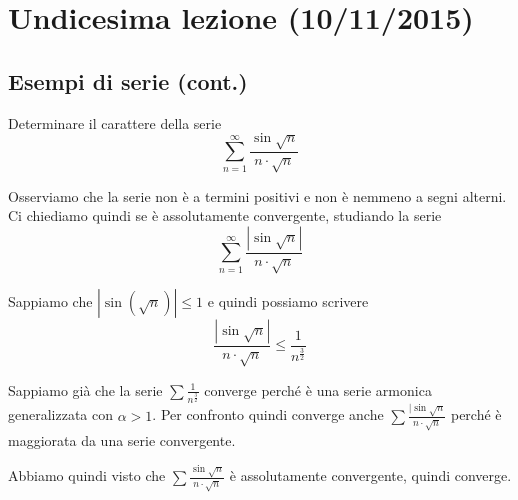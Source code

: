 \chapter{Undicesima lezione (10/11/2015)}

\section{Esempi di serie (cont.)}

\begin{example}
Determinare il carattere della serie
\begin{equation*}
\sum_{n=1}^\infty \frac{\sin \sqrt{n}}{n \cdot \sqrt{n}}
\end{equation*}

Osserviamo che la serie non è a termini positivi e non è nemmeno a segni alterni. Ci chiediamo quindi se è assolutamente convergente, studiando la serie
\begin{equation*}
\sum_{n=1}^\infty \frac{|\sin \sqrt{n}|}{n \cdot \sqrt{n}}
\end{equation*}

Sappiamo che $|\sin(\sqrt{n})| \le 1$ e quindi possiamo scrivere
\begin{equation*}
\frac{|\sin\sqrt{n}|}{n \cdot \sqrt{n}} \le \frac{1}{n^{\frac{3}{2}}}
\end{equation*}

Sappiamo già che la serie $\sum \frac{1}{n^\frac{3}{2}}$ converge perché è una serie armonica generalizzata con $\alpha > 1$. Per confronto quindi converge anche $\sum \frac{|\sin\sqrt{n}}{n \cdot \sqrt{n}}$ perché è maggiorata da una serie convergente.

Abbiamo quindi visto che $\sum \frac{\sin \sqrt{n}}{n \cdot \sqrt{n}}$ è assolutamente convergente, quindi converge.
\end{example}

